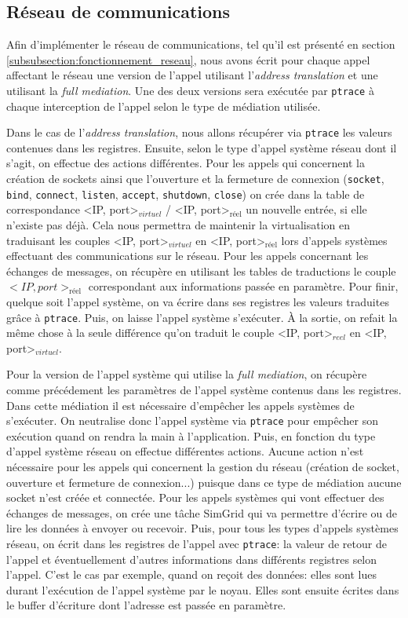 \subsection{Réseau de communications}
\label{subsection:network_implementaion}

Afin d'implémenter le réseau de communications, tel qu'il est présenté en section \ref{subsubsection:fonctionnement_reseau}, nous avons écrit pour chaque appel affectant le réseau une version de l'appel utilisant l'\textit{address translation} et une utilisant la \textit{full mediation}. Une des deux versions sera exécutée par \texttt{ptrace} à chaque interception de l'appel selon le type de médiation utilisée.

Dans le cas de l'\textit{address translation}, nous allons récupérer via \texttt{ptrace} les valeurs contenues dans les registres. Ensuite, selon le type d'appel système réseau dont il s'agit, on effectue des actions différentes. Pour les appels qui concernent la création de sockets ainsi que l'ouverture et la fermeture de connexion (\texttt{socket}, \texttt{bind}, \texttt{connect}, \texttt{listen}, \texttt{accept}, \texttt{shutdown}, \texttt{close}) on crée dans la table de correspondance <IP, port>$_{virtuel}$ / <IP, port>$_{\text{réel}}$ un nouvelle entrée, si elle n'existe pas déjà. Cela nous permettra de maintenir la virtualisation en traduisant les couples <IP, port>$_{virtuel}$ en <IP, port>$_{\text{réel}}$ lors d'appels systèmes effectuant des communications sur le réseau. Pour les appels concernant les échanges de messages, on récupère en utilisant les tables de traductions le couple  $<IP, port>_{\text{réel}}$ correspondant aux informations passée en paramètre. Pour finir, quelque soit l'appel système, on va écrire dans ses registres les valeurs traduites grâce à \texttt{ptrace}. Puis, on laisse l'appel système s'exécuter. À la sortie, on refait la même chose à la seule différence qu'on traduit le couple  <IP, port>$_{reel}$ en <IP, port>$_{virtuel}$.

Pour la version de l'appel système qui utilise la \textit{full mediation}, on récupère comme précédement les paramètres de l'appel système contenus dans les registres. Dans cette médiation il est nécessaire d'empêcher les appels systèmes de s'exécuter. On neutralise donc l'appel système via \texttt{ptrace} pour empêcher son exécution quand on rendra la main à l'application. Puis, en fonction du type d'appel système réseau on effectue différentes actions. Aucune action n'est nécessaire pour les appels qui concernent la gestion du réseau (création de socket, ouverture et fermeture de connexion...) puisque dans ce type de médiation aucune socket n'est créée et connectée. Pour les appels systèmes qui vont effectuer des échanges de messages, on crée une tâche SimGrid qui va permettre d'écrire ou de lire les données à envoyer ou recevoir. Puis, pour tous les types d'appels systèmes réseau, on écrit dans les registres de l'appel avec \texttt{ptrace}: la valeur de retour de l'appel et éventuellement d'autres informations dans différents registres selon l'appel. C'est le cas par exemple, quand on reçoit des données: elles sont lues durant l'exécution de l'appel système par le noyau. Elles sont ensuite écrites dans le buffer d'écriture dont l'adresse est passée en paramètre.
